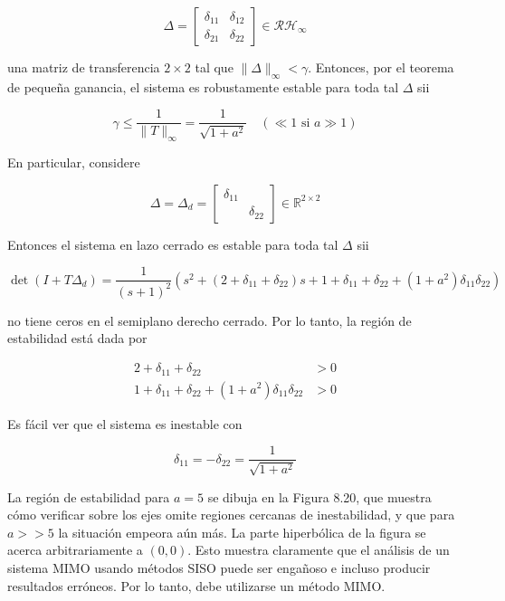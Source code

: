 $$
\Delta=\left[\begin{array}{ll}
\delta_{11} & \delta_{12} \\
\delta_{21} & \delta_{22}
\end{array}\right] \in \mathcal{R} \mathcal{H}_{\infty}
$$

una matriz de transferencia $2 \times 2$ tal que $\|\Delta\|_{\infty}<\gamma$. Entonces, por el teorema de pequeña ganancia, el sistema es robustamente estable para toda tal $\Delta$ sii

$$
\gamma \leq \frac{1}{\|T\|_{\infty}}=\frac{1}{\sqrt{1+a^{2}}} \quad(\ll 1 \text { si } a \gg 1)
$$


En particular, considere

$$
\Delta=\Delta_{d}=\left[\begin{array}{ll}
\delta_{11} & \\
& \delta_{22}
\end{array}\right] \in \mathbb{R}^{2 \times 2}
$$

Entonces el sistema en lazo cerrado es estable para toda tal $\Delta$ sii

$$
\operatorname{det}\left(I+T \Delta_{d}\right)=\frac{1}{(s+1)^{2}}\left(s^{2}+\left(2+\delta_{11}+\delta_{22}\right) s+1+\delta_{11}+\delta_{22}+\left(1+a^{2}\right) \delta_{11} \delta_{22}\right)
$$

no tiene ceros en el semiplano derecho cerrado. Por lo tanto, la región de estabilidad está dada por

$$
\begin{aligned}
2+\delta_{11}+\delta_{22} & >0 \\
1+\delta_{11}+\delta_{22}+\left(1+a^{2}\right) \delta_{11} \delta_{22} & >0
\end{aligned}
$$

Es fácil ver que el sistema es inestable con

$$
\delta_{11}=-\delta_{22}=\frac{1}{\sqrt{1+a^{2}}}
$$

La región de estabilidad para $a=5$ se dibuja en la Figura 8.20, que muestra cómo verificar sobre los ejes omite regiones cercanas de inestabilidad, y que para $a>>5$ la situación empeora aún más. La parte hiperbólica de la figura se acerca arbitrariamente a $(0,0)$. Esto muestra claramente que el análisis de un sistema MIMO usando métodos SISO puede ser engañoso e incluso producir resultados erróneos. Por lo tanto, debe utilizarse un método MIMO.

